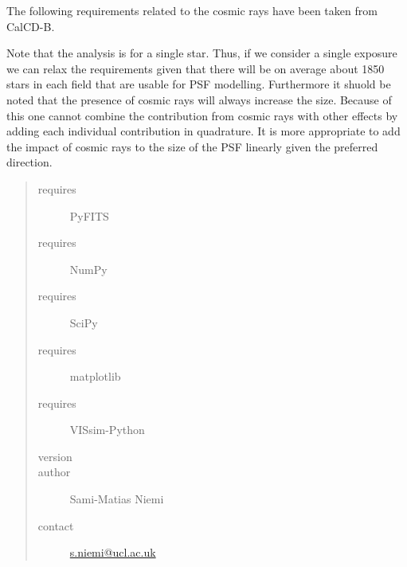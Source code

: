 \documentclass[a4paper,11pt,english]{sphinxmanual}
\begin{document}
The following requirements related to the cosmic rays have been taken from CalCD-B.

Note that the analysis is for a single star. Thus, if we consider a single exposure we can
relax the requirements given that there will be on average about 1850 stars in each field that
are usable for PSF modelling. Furthermore it shuold be noted that the presence of cosmic rays
will always increase the size. Because of this one cannot combine the contribution from cosmic
rays with other effects by adding each individual contribution in quadrature. It is more
appropriate to add the impact of cosmic rays to the size of the PSF linearly given the preferred
direction.
\begin{quote}\begin{description}
\item[{requires}] \leavevmode
PyFITS

\item[{requires}] \leavevmode
NumPy

\item[{requires}] \leavevmode
SciPy

\item[{requires}] \leavevmode
matplotlib

\item[{requires}] \leavevmode
VISsim-Python

\item[{version}] 

\item[{author}] \leavevmode
Sami-Matias Niemi

\item[{contact}] \leavevmode
\href{mailto:s.niemi@ucl.ac.uk}{s.niemi@ucl.ac.uk}

\end{description}\end{quote}
\end{document}
